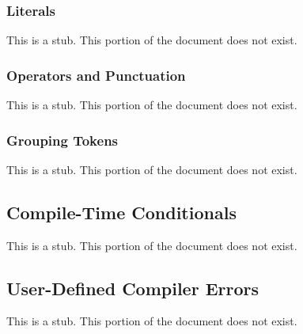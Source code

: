 \subsubsection{Literals}
\label{Literals}

This is a stub.  This portion of the document does not exist.

\subsubsection{Operators and Punctuation}
\label{Operators_and_Punctuation}

This is a stub.  This portion of the document does not exist.

\subsubsection{Grouping Tokens}
\label{Grouping_Tokens}

This is a stub.  This portion of the document does not exist.

\subsection{Compile-Time Conditionals}
\label{Compile-Time_Conditionals}

This is a stub.  This portion of the document does not exist.

\subsection{User-Defined Compiler Errors}
\label{User-Defined_Compiler_Errors}

This is a stub.  This portion of the document does not exist.
